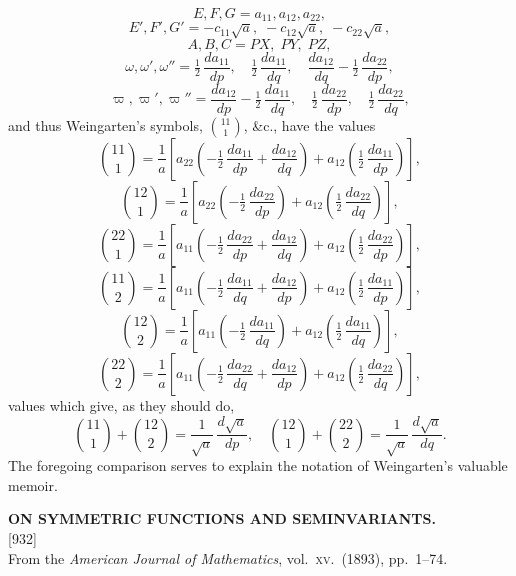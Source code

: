 \documentclass[11pt]{article}
\newcommand{\paper}[3]{%
  \clearpage
  \begin{center}
    {\large\bfseries #2}\\[0.5em]
    {\small [#1]}\\[0.3em]
    {\small #3}
  \end{center}
  \vspace{0.5em}
}
\begin{document}
\[
E, F, G = a_{11}, a_{12}, a_{22},
\]
\[
E', F', G' = -c_{11}\sqrt{a},\; -c_{12}\sqrt{a},\; -c_{22}\sqrt{a},
\]
\[
A, B, C = PX,\; PY,\; PZ,
\]
\[
\omega, \omega', \omega'' = \tfrac12\,\frac{da_{11}}{dp},\quad \tfrac12\,\frac{da_{11}}{dq},\quad \frac{da_{12}}{dq} - \tfrac12\,\frac{da_{22}}{dp},
\]
\[
\varpi, \varpi', \varpi'' = \frac{da_{12}}{dp} - \tfrac12\,\frac{da_{11}}{dq},\quad \tfrac12\,\frac{da_{22}}{dp},\quad \tfrac12\,\frac{da_{22}}{dq},
\]
and thus Weingarten's symbols, $\binom{11}{1}$, \&c., have the values
\[
\binom{11}{1} = \frac{1}{a}\!\left[a_{22}\!\left(-\tfrac12\,\frac{da_{11}}{dp} + \frac{da_{12}}{dq}\right) + a_{12}\!\left(\tfrac12\,\frac{da_{11}}{dp}\right)\right],
\]
\[
\binom{12}{1} = \frac{1}{a}\!\left[a_{22}\!\left(-\tfrac12\,\frac{da_{22}}{dp}\right) + a_{12}\!\left(\tfrac12\,\frac{da_{22}}{dq}\right)\right],
\]
\[
\binom{22}{1} = \frac{1}{a}\!\left[a_{11}\!\left(-\tfrac12\,\frac{da_{22}}{dp} + \frac{da_{12}}{dq}\right) + a_{12}\!\left(\tfrac12\,\frac{da_{22}}{dp}\right)\right],
\]
\[
\binom{11}{2} = \frac{1}{a}\!\left[a_{11}\!\left(-\tfrac12\,\frac{da_{11}}{dq} + \frac{da_{12}}{dp}\right) + a_{12}\!\left(\tfrac12\,\frac{da_{11}}{dp}\right)\right],
\]
\[
\binom{12}{2} = \frac{1}{a}\!\left[a_{11}\!\left(-\tfrac12\,\frac{da_{11}}{dq}\right) + a_{12}\!\left(\tfrac12\,\frac{da_{11}}{dq}\right)\right],
\]
\[
\binom{22}{2} = \frac{1}{a}\!\left[a_{11}\!\left(-\tfrac12\,\frac{da_{22}}{dq} + \frac{da_{12}}{dp}\right) + a_{12}\!\left(\tfrac12\,\frac{da_{22}}{dq}\right)\right],
\]
values which give, as they should do,
\[
\binom{11}{1} + \binom{12}{2} = \frac{1}{\sqrt{a}}\,\frac{d\sqrt{a}}{dp},\quad \binom{12}{1} + \binom{22}{2} = \frac{1}{\sqrt{a}}\,\frac{d\sqrt{a}}{dq}.
\]
The foregoing comparison serves to explain the notation of Weingarten's valuable memoir.

\paper{932}{ON SYMMETRIC FUNCTIONS AND SEMINVARIANTS.}{From the \textit{American Journal of Mathematics}, vol.\ \textsc{xv}.\ (1893), pp.\ 1--74.}
\end{document}
